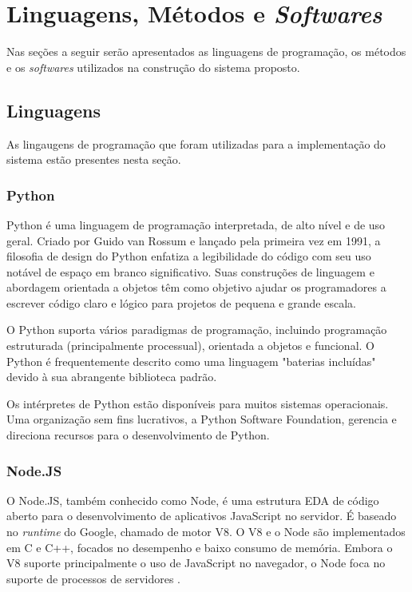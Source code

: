 \chapter{Linguagens, Métodos e \textit{Softwares}}
Nas seções a seguir serão apresentados as linguagens de programação, os métodos e os \textit{softwares} utilizados na construção do sistema proposto.
\section{Linguagens}
As lingaugens de programação que foram utilizadas para a implementação do sistema estão presentes nesta seção.
\subsection{Python}

Python é uma linguagem de programação interpretada, de alto nível e de uso geral. Criado por Guido van Rossum e lançado pela primeira vez em 1991, a filosofia de design do Python enfatiza a legibilidade do código com seu uso notável de espaço em branco significativo. Suas construções de linguagem e abordagem orientada a objetos têm como objetivo ajudar os programadores a escrever código claro e lógico para projetos de pequena e grande escala.

O Python suporta vários paradigmas de programação, incluindo programação estruturada (principalmente processual), orientada a objetos e funcional. O Python é frequentemente descrito como uma linguagem "baterias incluídas" devido à sua abrangente biblioteca padrão.

Os intérpretes de Python estão disponíveis para muitos sistemas operacionais. Uma organização sem fins lucrativos, a Python Software Foundation, gerencia e direciona recursos para o desenvolvimento de Python. \cite{van2007python}

\subsection{Node.JS}


O Node.JS, também conhecido como Node, é uma estrutura EDA de código aberto para o desenvolvimento de aplicativos JavaScript no servidor. É baseado no \textit{runtime} do Google, chamado de motor V8. O V8 e o Node são implementados em C e C++, focados no desempenho e baixo consumo de memória. Embora o V8 suporte principalmente o uso de JavaScript no navegador, o Node foca no suporte de processos de servidores \cite{Tilkov2010}.


